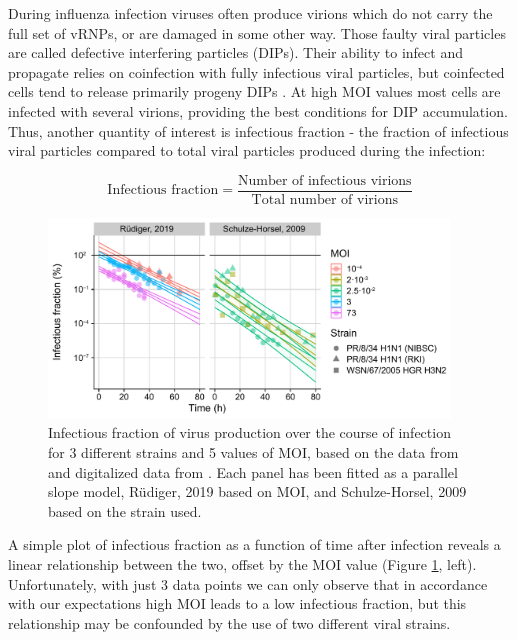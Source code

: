 During influenza infection viruses often produce virions which do not carry the full set of vRNPs, or are damaged in some other way. Those faulty viral particles are called defective interfering particles (DIPs). Their ability to infect and propagate relies on coinfection with fully infectious viral particles, but coinfected cells tend to release primarily progeny DIPs \cite{frensing2014impact}. At high MOI values most cells are infected with several virions, providing the best conditions for DIP accumulation. Thus, another quantity of interest is infectious fraction - the fraction of infectious viral particles compared to total viral particles produced during the infection:

\begin{equation}
    \text{Infectious fraction} = \frac{\text{Number of infectious virions}}{\text{Total number of virions}}
\end{equation}

\begin{figure}
\begin{center}
\includegraphics[width=0.95\textwidth, trim={0cm 0cm 0cm 0cm}, clip]{D_chapters/3_DARPinModels/InfectiousFractionAll.pdf}
\caption[Infectious fraction of virus production over the course of infection]%
{Infectious fraction of virus production over the course of infection for 3 different strains and 5 values of MOI, based on the data from \cite{frensing2016influenza, rudiger2019multiscale} and digitalized data from \cite{schulze2009infection}. Each panel has been fitted as a parallel slope model, R\"udiger, 2019 based on MOI, and Schulze-Horsel, 2009 based on the strain used.}
\label{figure:infectiousFraction}
\end{center}
\end{figure}

A simple plot of infectious fraction \cite{rudiger2019multiscale, frensing2016influenza} as a function of time after infection reveals a linear relationship between the two, offset by the MOI value (Figure \ref{figure:infectiousFraction}, left). Unfortunately, with just 3 data points we can only observe that in accordance with our expectations high MOI leads to a low infectious fraction, but this relationship may be confounded by the use of two different viral strains.

